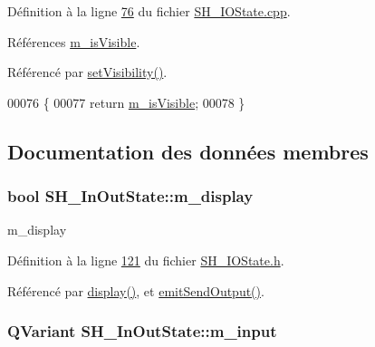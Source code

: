 Définition à la ligne \hyperlink{SH__IOState_8cpp_source_l00076}{76} du fichier \hyperlink{SH__IOState_8cpp_source}{S\-H\-\_\-\-I\-O\-State.\-cpp}.



Références \hyperlink{classSH__InOutState_a8fd66b185c9a55f0e84daa97e2acf53a}{m\-\_\-is\-Visible}.



Référencé par \hyperlink{classSH__InOutState_a7fdfaa6f600f0ac4a96f238a038ba9ad}{set\-Visibility()}.


\begin{DoxyCode}
00076                                \{
00077     \textcolor{keywordflow}{return} \hyperlink{classSH__InOutState_a8fd66b185c9a55f0e84daa97e2acf53a}{m\_isVisible};
00078 \}
\end{DoxyCode}


\subsection{Documentation des données membres}
\hypertarget{classSH__InOutState_a3351fa53593266a1ae4334d33d0b1610}{
\subsubsection[{m\-\_\-display}]{\setlength{\rightskip}{0pt plus 5cm}bool S\-H\-\_\-\-In\-Out\-State\-::m\-\_\-display\hspace{0.3cm}{\ttfamily [private]}}}\label{classSH__InOutState_a3351fa53593266a1ae4334d33d0b1610}


m\-\_\-display 



Définition à la ligne \hyperlink{SH__IOState_8h_source_l00121}{121} du fichier \hyperlink{SH__IOState_8h_source}{S\-H\-\_\-\-I\-O\-State.\-h}.



Référencé par \hyperlink{classSH__InOutState_a616f88b20478b81b2927a9ddc2b4f521}{display()}, et \hyperlink{classSH__InOutState_a40995f4a8201f21d26b7e78b7e7b652e}{emit\-Send\-Output()}.

\hypertarget{classSH__InOutState_ae43d6fdc62047f285913837648a1e883}{
\subsubsection[{m\-\_\-input}]{\setlength{\rightskip}{0pt plus 5cm}Q\-Variant S\-H\-\_\-\-In\-Out\-State\-::m\-\_\-input\hspace{0.3cm}{\ttfamily [private]}}}\label{classSH__InOutState_ae43d6fdc62047f285913837648a1e883}


